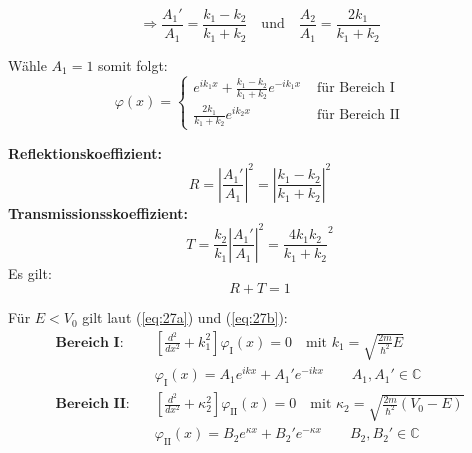 \begin{equation*}
  \Rightarrow \frac{A_1'}{A_1} = \frac{k_1-k_2}{k_1+k_2} \quad
  \mbox{und} \quad
  \frac{A_2}{A_1} = \frac{2k_1}{k_1+k_2}
\end{equation*}

Wähle $A_1 = 1$ somit folgt:
\begin{equation*}
  \varphi(x) =
  \begin{cases}
    e^{ik_1x}+\frac{k_1-k_2}{k_1+k_2} e^{-ik_1x} & \mbox{ für Bereich I} \\
    \frac{2k_1}{k_1+k_2} e^{ik_2x} & \mbox{ für Bereich II}
  \end{cases}
\end{equation*}

\textbf{Reflektionskoeffizient:}
  \begin{equation}
    \label{eq:29}
    R= \left|\frac{A_1'}{A_1}\right|^2 
    = \left|\frac{k_1-k_2}{k_1+k_2}\right|^2
  \end{equation}
\textbf{Transmissionsskoeffizient:}
  \begin{equation}
    \label{eq:30}
    T= \frac{k_2}{k_1}\left|\frac{A_1'}{A_1}\right|^2 
    = \frac{4k_1k_2}{k_1+k_2}^2
  \end{equation}
Es gilt:
  \begin{equation}
    \label{eq:31}
    \boxed{R+T=1}
  \end{equation}

\bigskip
Für $E<V_0$ gilt laut (\ref{eq:27a}) und (\ref{eq:27b}):
\begin{align*}
    \textbf{Bereich I:} \quad &\left[\frac{d^2}{dx^2}+k_1^2\right]\varphi_\textrm{I}(x)=0 
    \quad \textrm{mit } k_1=\sqrt{\frac{2m}{\hbar^2}E} \\
    &\varphi_\textrm{I}(x)=A_1e^{ikx}+A_1'e^{-ikx} \qquad A_1,A_1' \in \mathbb{C} \\[2ex]
    \textbf{Bereich II:} \quad &\left[\frac{d^2}{dx^2}+\kappa_2^2\right]\varphi_\textrm{II}(x)=0
    \quad  \textrm{mit } \kappa_2=\sqrt{\frac{2m}{\hbar^2}(V_0-E)} \\
     &\varphi_\textrm{II}(x)=B_2e^{\kappa x}+B_2'e^{-\kappa x} \qquad B_2,B_2' \in \mathbb{C}
\end{align*}

